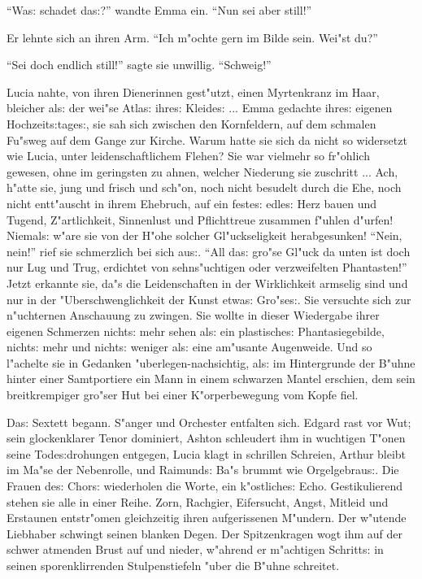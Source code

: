 \documentclass[oneside,12pt]{book}
\newcommand{\s}{s:}%
\begin{document}
"`Wa{\s} schadet da{\s}?"' wandte Emma ein. "`Nun sei aber
still!"'

Er lehnte sich an ihren Arm. "`Ich m"ochte gern im Bilde sein.
Wei"st du?"'

"`Sei doch endlich still!"' sagte sie unwillig. "`Schweig!"'

Lucia nahte, von ihren Dienerinnen gest"utzt, einen Myrtenkranz im
Haar, bleicher al{\s} der wei"se Atla{\s} ihre{\s} Kleide{\s} ...
Emma gedachte ihre{\s} eigenen Hochzeit{\s}tage{\s}, sie sah sich
zwischen den Kornfeldern, auf dem schmalen Fu"sweg auf dem Gange
zur Kirche. Warum hatte sie sich da nicht so widersetzt wie Lucia,
unter leidenschaftlichem Flehen? Sie war vielmehr so fr"ohlich
gewesen, ohne im geringsten zu ahnen, welcher Niederung sie
zuschritt ... Ach, h"atte sie, jung und frisch und sch"on, noch
nicht besudelt durch die Ehe, noch nicht entt"auscht in ihrem
Ehebruch, auf ein feste{\s} edle{\s} Herz bauen und Tugend,
Z"artlichkeit, Sinnenlust und Pflichttreue zusammen f"uhlen
d"urfen! Niemal{\s} w"are sie von der H"ohe solcher
Gl"uckseligkeit herabgesunken! "`Nein, nein!"' rief sie
schmerzlich bei sich au{\s}. "`All da{\s} gro"se Gl"uck da unten
ist doch nur Lug und Trug, erdichtet von sehns"uchtigen oder
verzweifelten Phantasten!"' Jetzt erkannte sie, da"s die
Leidenschaften in der Wirklichkeit armselig sind und nur in der
"Uberschwenglichkeit der Kunst etwa{\s} Gro"se{\s}. Sie versuchte
sich zur n"uchternen Anschauung zu zwingen. Sie wollte in dieser
Wiedergabe ihrer eigenen Schmerzen nicht{\s} mehr sehen al{\s} ein
plastische{\s} Phantasiegebilde, nicht{\s} mehr und nicht{\s}
weniger al{\s} eine am"usante Augenweide. Und so l"achelte sie in
Gedanken "uberlegen-nachsichtig, al{\s} im Hintergrunde der B"uhne
hinter einer Samtportiere ein Mann in einem schwarzen Mantel
erschien, dem sein breitkrempiger gro"ser Hut bei einer
K"orperbewegung vom Kopfe fiel.

Da{\s} Sextett begann. S"anger und Orchester entfalten sich.
Edgard rast vor Wut; sein glockenklarer Tenor dominiert, Ashton
schleudert ihm in wuchtigen T"onen seine Tode{\s}drohungen
entgegen, Lucia klagt in schrillen Schreien, Arthur bleibt im
Ma"se der Nebenrolle, und Raimund{\s} Ba"s brummt wie
Orgelgebrau{\s}. Die Frauen de{\s} Chor{\s} wiederholen die Worte,
ein k"ostliche{\s} Echo. Gestikulierend stehen sie alle in einer
Reihe. Zorn, Rachgier, Eifersucht, Angst, Mitleid und Erstaunen
entstr"omen gleichzeitig ihren aufgerissenen M"undern. Der
w"utende Liebhaber schwingt seinen blanken Degen. Der
Spitzenkragen wogt ihm auf der schwer atmenden Brust auf und
nieder, w"ahrend er m"achtigen Schritt{\s} in seinen
sporenklirrenden Stulpenstiefeln "uber die B"uhne schreitet.
\end{document}
